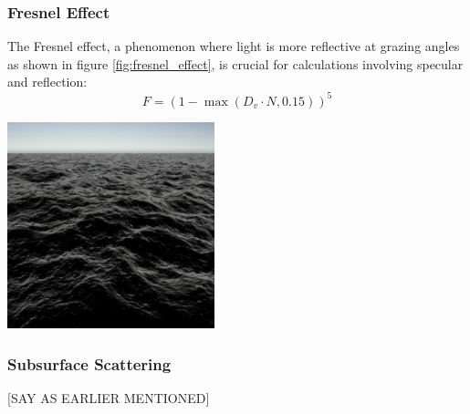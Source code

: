 \subsubsection{Fresnel Effect}
The Fresnel effect, a phenomenon where light is more reflective at grazing angles as shown in figure \ref{fig:fresnel_effect}, is crucial for calculations involving specular and reflection:
\begin{equation}
    F = (1 - \max(D_v \cdot N, 0.15))^{5}
\end{equation}
\begin{minipage}{1\textwidth}
    \centering
    \includegraphics[width=0.45\textwidth]{"images/fresnel.png"}
    \label{fig:fresnel_effect}
\end{minipage}

\subsubsection{Subsurface Scattering}

[SAY AS EARLIER MENTIONED]

